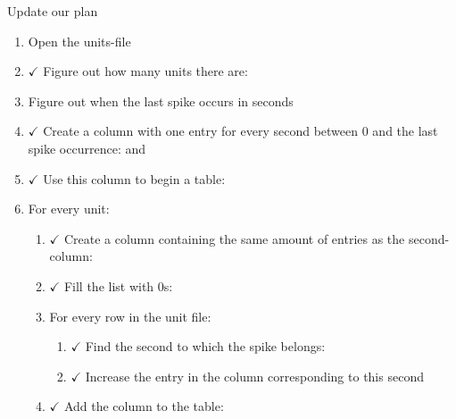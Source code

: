 \documentclass[aspectratio=169]{beamer}
\begin{document}
\begin{frame}{Update our plan}
\begin{enumerate}
\item {Open the units-file}
\item {\begin{math} \checkmark \end{math}
	Figure out how many units there are:
}
\item {Figure out when the last spike occurs in seconds}
\item {\begin{math} \checkmark \end{math}
	Create a column with one entry for every second between 0 and the last spike occurrence:
	 and 
}
\item {\begin{math} \checkmark \end{math}
	Use this column to begin a table:
}
\item {For every unit:}
\begin{enumerate}
	\item {\begin{math} \checkmark \end{math}
		Create a column containing the same amount of entries as the second-column:
	}
	\item {\begin{math} \checkmark \end{math}
		Fill the list with 0s:
	}
	\item {For every row in the unit file:}
	\begin{enumerate}
		\item {\begin{math} \checkmark \end{math}
			Find the second to which the spike belongs:
		}
		\item {\begin{math} \checkmark \end{math}
			Increase the entry in the column corresponding to this second
		}
	\end{enumerate}
	\item {\begin{math} \checkmark \end{math}
		Add the column to the table:
}
\end{enumerate}
\end{enumerate}
\end{frame}
\end{document}
